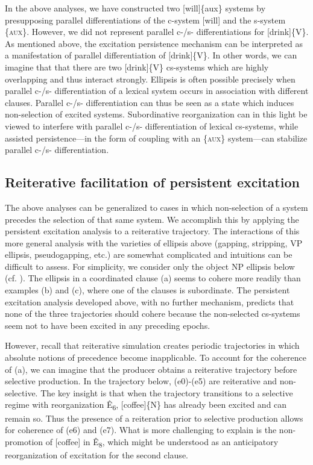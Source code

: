   In the above analyses, we have constructed two [will]\{aux\} systems by presupposing parallel differentiations of the c-system [will] and the s-system \{\textsc{aux}\}. However, we did not represent parallel c-/s- differentiations for [drink]\{V\}. As mentioned above, the excitation persistence mechanism can be interpreted as a manifestation of parallel differentiation of [drink]\{V\}. In other words, we can imagine that that there are two [drink]\{V\} cs-systems which are highly overlapping and thus interact strongly. Ellipsis is often possible precisely when parallel c-/s- differentiation of a lexical system occurs in association with different clauses. Parallel c-/s- differentiation can thus be seen as a state which induces non-selection of excited systems. Subordinative reorganization can in this light be viewed to interfere with parallel c-/s- differentiation of lexical cs-systems, while assisted persistence—in the form of coupling with an \{\textsc{aux}\} system—can stabilize parallel c-/s- differentiation.

\subsection{Reiterative facilitation of persistent excitation}

The above analyses can be generalized to cases in which non-selection of a system precedes the selection of that same system. We accomplish this by applying the persistent excitation analysis to a reiterative trajectory. The interactions of this more general analysis with the varieties of ellipsis above (gapping, stripping, VP ellipsis, pseudogapping, etc.) are somewhat complicated and intuitions can be difficult to assess. For simplicity, we consider only the object NP ellipsis below (cf. \citealt{Wilder1997}). The ellipsis in a coordinated clause (a) seems to cohere more readily than examples (b) and (c), where one of the clauses is subordinate. The persistent excitation analysis developed above, with no further mechanism, predicts that none of the three trajectories should cohere because the non-selected cs-systems seem not to have been excited in any preceding epochs.

\ea
{}
\z
\z

  However, recall that reiterative simulation creates periodic trajectories in which absolute notions of precedence become inapplicable. To account for the coherence of (a), we can imagine that the producer obtains a reiterative trajectory before selective production. In the trajectory below, (e0)-(e5) are reiterative and non-selective. The key insight is that when the trajectory transitions to a selective regime with reorganization Ê\textsubscript{6}, [coffee]\{N\} has already been excited and can remain so. Thus the presence of a reiteration prior to selective production allows for coherence of (e6) and (e7). What is more challenging to explain is the non-promotion of [coffee] in Ê\textsubscript{8}, which might be understood as an anticipatory reorganization of excitation for the second clause.

